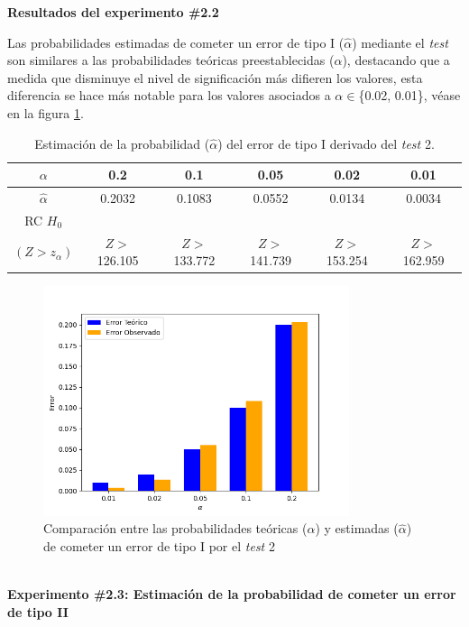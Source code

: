 \documentclass[12pt]{report}
\begin{document}
\textbf{Resultados del experimento \#2.2}

Las probabilidades estimadas de cometer un error de tipo I ($\hat{\alpha}$) mediante el \textit{test} son similares a las probabilidades teóricas preestablecidas ($\alpha$), destacando que a medida que disminuye el nivel de significación más difieren los valores, esta diferencia se hace más notable para los valores asociados a $\alpha \in$\{0.02, 0.01\}, véase en la figura \ref{Teorico vs Observado1}.
\begin{table}[h!]
	\centering
	\caption{Estimación de la probabilidad ($\hat{\alpha}$) del error de tipo I derivado del \textit{test} 2.}
	\begin{tabular}{|c|ccccc|}
		\hline
		$\alpha$ &  0.2 & 0.1 & 0.05 & 0.02 &  0.01 \\
		\hline
		$\hat{\alpha}$ & 0.2032 & 0.1083 & 0.0552 & 0.0134 & 0.0034 \\
		\hline
		RC $H_0$  &		&				&			&			&\\
		$(Z>z_\alpha)$&$Z>$126.105& $Z>$133.772& $Z>$141.739& $Z>$153.254& $Z>$162.959 \\
		\hline
	\end{tabular}
	
	\label{tab:error1-prob1}
\end{table}
\begin{figure}[ht]
	\centering
	
	\includegraphics[width=0.8\textwidth]{4td_teo_obs.png}
	\caption{Comparación entre las probabilidades teóricas ($\alpha$) y estimadas ($\hat{\alpha}$) de cometer un error de tipo I por el \textit{test} 2}
	\label{Teorico vs Observado1}
\end{figure}\\

\textbf{Experimento \#2.3: Estimación de la probabilidad de cometer un error de tipo II}
\end{document}
